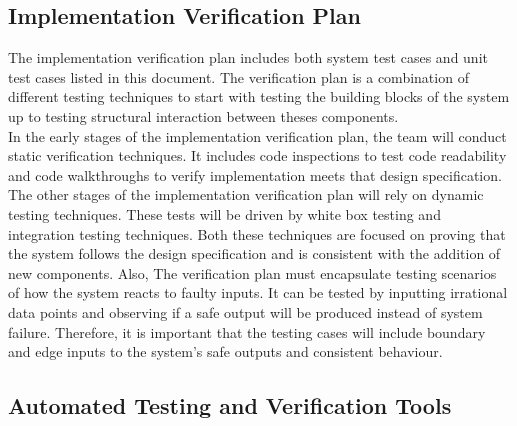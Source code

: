 \documentclass[12pt, titlepage]{article}
\begin{document}



\subsection{Implementation Verification Plan}

The implementation verification plan includes both
system test cases and unit test cases listed in this 
document. The verification plan is a combination of 
different testing techniques to start with testing the 
building blocks of the system up to testing structural 
interaction between theses components.\\ 
In the early stages of the implementation verification 
plan, the team will conduct static verification
techniques. It includes code inspections to test code 
readability and code walkthroughs to verify 
implementation meets that design specification. \\
The other stages of the implementation verification plan will rely on dynamic 
testing techniques. These tests will be driven by white box testing and 
integration testing techniques. Both these techniques are focused on proving that 
the system follows the design specification and is consistent with the addition of
new components. Also, The verification plan must encapsulate testing scenarios of how the system reacts to faulty inputs. It can be tested by inputting irrational data points and observing if a safe output will be produced instead of system failure. Therefore, it is important that the testing cases will include boundary and edge inputs to the system's safe outputs and consistent behaviour.



\subsection{Automated Testing and Verification Tools}

\end{document}
